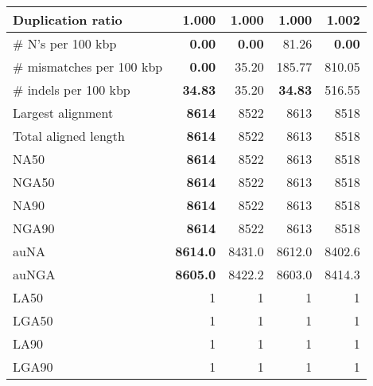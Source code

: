 \documentclass[12pt,a4paper]{article}
\begin{document}
\begin{table}[ht]
\begin{center}
\begin{tabular}{|l*{4}{|r}|}
Duplication ratio & {\bf 1.000} & {\bf 1.000} & {\bf 1.000} & 1.002 \\ \hline
\# N's per 100 kbp & {\bf 0.00} & {\bf 0.00} & 81.26 & {\bf 0.00} \\ \hline
\# mismatches per 100 kbp & {\bf 0.00} & 35.20 & 185.77 & 810.05 \\ \hline
\# indels per 100 kbp & {\bf 34.83} & 35.20 & {\bf 34.83} & 516.55 \\ \hline
Largest alignment & {\bf 8614} & 8522 & 8613 & 8518 \\ \hline
Total aligned length & {\bf 8614} & 8522 & 8613 & 8518 \\ \hline
NA50 & {\bf 8614} & 8522 & 8613 & 8518 \\ \hline
NGA50 & {\bf 8614} & 8522 & 8613 & 8518 \\ \hline
NA90 & {\bf 8614} & 8522 & 8613 & 8518 \\ \hline
NGA90 & {\bf 8614} & 8522 & 8613 & 8518 \\ \hline
auNA & {\bf 8614.0} & 8431.0 & 8612.0 & 8402.6 \\ \hline
auNGA & {\bf 8605.0} & 8422.2 & 8603.0 & 8414.3 \\ \hline
LA50 & 1 & 1 & 1 & 1 \\ \hline
LGA50 & 1 & 1 & 1 & 1 \\ \hline
LA90 & 1 & 1 & 1 & 1 \\ \hline
LGA90 & 1 & 1 & 1 & 1 \\ \hline
\end{tabular}
\end{center}
\end{table}
\end{document}
